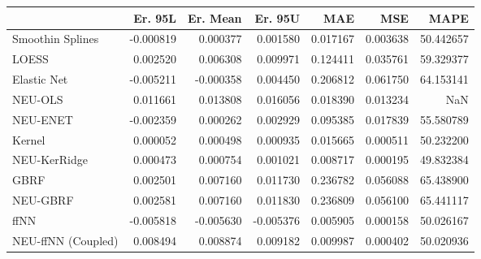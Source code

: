 \begin{tabular}{lrrrrrr}
\toprule
{} &   Er. 95L &  Er. Mean &   Er. 95U &       MAE &       MSE &       MAPE \\
\midrule
Smoothin Splines   & -0.000819 &  0.000377 &  0.001580 &  0.017167 &  0.003638 &  50.442657 \\
LOESS              &  0.002520 &  0.006308 &  0.009971 &  0.124411 &  0.035761 &  59.329377 \\
Elastic Net        & -0.005211 & -0.000358 &  0.004450 &  0.206812 &  0.061750 &  64.153141 \\
NEU-OLS            &  0.011661 &  0.013808 &  0.016056 &  0.018390 &  0.013234 &        NaN \\
NEU-ENET           & -0.002359 &  0.000262 &  0.002929 &  0.095385 &  0.017839 &  55.580789 \\
Kernel             &  0.000052 &  0.000498 &  0.000935 &  0.015665 &  0.000511 &  50.232200 \\
NEU-KerRidge       &  0.000473 &  0.000754 &  0.001021 &  0.008717 &  0.000195 &  49.832384 \\
GBRF               &  0.002501 &  0.007160 &  0.011730 &  0.236782 &  0.056088 &  65.438900 \\
NEU-GBRF           &  0.002581 &  0.007160 &  0.011830 &  0.236809 &  0.056100 &  65.441117 \\
ffNN               & -0.005818 & -0.005630 & -0.005376 &  0.005905 &  0.000158 &  50.026167 \\
NEU-ffNN (Coupled) &  0.008494 &  0.008874 &  0.009182 &  0.009987 &  0.000402 &  50.020936 \\
\bottomrule
\end{tabular}
